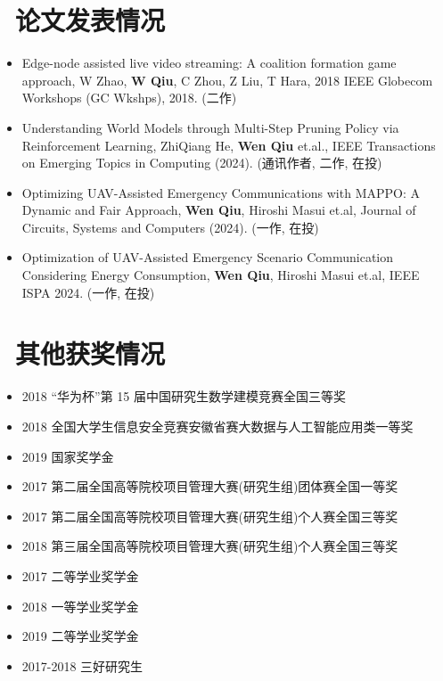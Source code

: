 \documentclass{resume}
\begin{document}
\section{\faCogs\ 论文发表情况}
\begin{itemize}[parsep=0.5ex]
  \item Edge-node assisted live video streaming: A coalition formation game approach, W Zhao, \textbf{W Qiu}, C Zhou, Z Liu, T Hara, 2018 IEEE Globecom Workshops (GC Wkshps), 2018. (二作)
  \item Understanding World Models through Multi-Step Pruning Policy via Reinforcement Learning, ZhiQiang He, \textbf{Wen Qiu} et.al., IEEE Transactions on Emerging Topics in Computing (2024). (通讯作者, 二作, 在投)
  \item Optimizing UAV-Assisted Emergency Communications with MAPPO: A Dynamic and Fair Approach, \textbf{Wen Qiu}, Hiroshi Masui et.al, Journal of Circuits, Systems and Computers (2024). (一作, 在投)
  \item Optimization of UAV-Assisted Emergency Scenario Communication Considering Energy Consumption, \textbf{Wen Qiu}, Hiroshi Masui et.al, IEEE ISPA 2024. (一作, 在投)
\end{itemize}

\section{\faHeartO\ 其他获奖情况}
\begin{itemize}
  \item 2018 “华为杯”第 15 届中国研究生数学建模竞赛全国三等奖
  \item 2018 全国大学生信息安全竞赛安徽省赛大数据与人工智能应用类一等奖
  \item 2019 国家奖学金
  \item 2017 第二届全国高等院校项目管理大赛(研究生组)团体赛全国一等奖
  \item 2017 第二届全国高等院校项目管理大赛(研究生组)个人赛全国三等奖
  \item 2018 第三届全国高等院校项目管理大赛(研究生组)个人赛全国三等奖
  \item 2017 二等学业奖学金
  \item 2018 一等学业奖学金
  \item 2019 二等学业奖学金
  \item 2017-2018 三好研究生
\end{itemize}
\end{document}
